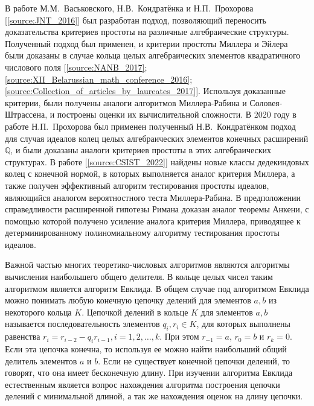 \documentclass[_00_dissertation.tex]{subfiles}
\begin{document}
В работе М.М.~Васьковского, Н.В.~Кондратёнка и Н.П.~Прохорова [\ref{source:JNT_2016}] был разработан подход, позволяющий переносить доказательства критериев простоты на различные алгебраические структуры.
Полученный подход был применен, и критерии простоты Миллера и Эйлера были доказаны в случае кольца целых алгебраических элементов квадратичного числового поля [\ref{source:NANB_2017}; \ref{source:XII_Belarussian_math_conference_2016}; \ref{source:Collection_of_articles_by_laureates_2017}].
Используя доказанные критерии, были получены аналоги алгоритмов Миллера-Рабина и Соловея-Штрассена, и построены оценки их вычислительной сложности.
В 2020 году в работе Н.П.~Прохорова \cite{source:Prochorov} был применен полученный Н.В.~Кондратёнком подход для случая идеалов колец целых алгебраических элементов конечных расширений $\mathbb{Q}$, и были доказаны аналоги критериев простоты в этих алгебраических структурах.
В работе [\ref{source:CSIST_2022}] найдены новые классы дедекиндовых колец с конечной нормой, в которых выполняется аналог критерия Миллера, а также получен эффективный алгоритм тестирования простоты идеалов, являющийся аналогом вероятностного теста Миллера-Рабина.
В предположении справедливости расширенной гипотезы Римана доказан аналог теоремы Анкени, с помощью которой получено усиление аналога критерия Миллера, приводящее к детерминированному полиномиальному алгоритму тестирования простоты идеалов.


Важной частью многих теоретико-числовых алгоритмов являются алгоритмы вычисления наибольшего общего делителя.
В кольце целых чисел таким алгоритмом является алгоритм Евклида.
В общем случае под алгоритмом Евклида можно понимать любую конечную цепочку делений для элементов $a, b$ из некоторого кольца $K$.
Цепочкой делений в кольце $K$ для элементов $a, b$ называется последовательность элементов $q_i, r_i \in K$, для которых выполнены равенства $r_i=r_{i-2}-q_i r_{i-1}, i = 1, 2, \ldots, k$.
При этом $r_{-1} = a$, $r_0 = b$ и $r_k=0$.
Если эта цепочка конечна, то используя ее можно найти наибольший общий делитель элементов $a$ и $b$.
Если не существует конечной цепочки делений, то говорят, что она имеет бесконечную длину.
При изучении алгоритма Евклида естественным является вопрос нахождения алгоритма построения цепочки делений с минимальной длиной, а так же нахождения оценок на длину цепочки.
\end{document}
